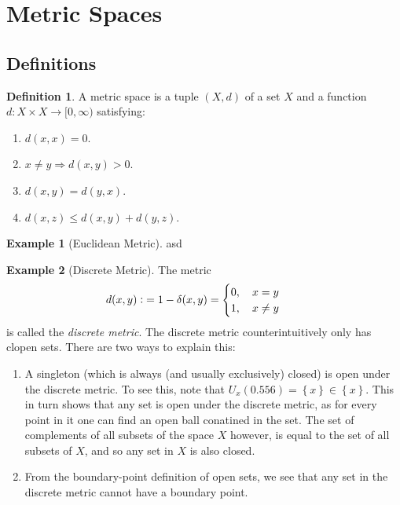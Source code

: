 \documentclass{article}
\newcommand{\vc}{\vcentcolon}
\theoremstyle{definition}
\newtheorem{defn}{Definition}[subsubsection]
\newtheorem{example}{Example}[subsubsection]
\begin{document}
\section{Metric Spaces}
\subsection{Definitions}
\begin{defn}
	A metric space is a tuple $(X,d)$ of a set $X$ and a function $d:X\times X\rightarrow[0,\infty)$ satisfying:
	\begin{enumerate}
		\item $d(x,x)=0$.
		\item $x\not=y\Rightarrow d(x,y)>0$.
		\item $d(x,y)=d(y,x)$.
		\item $d(x,z)\leq d(x,y)+d(y,z)$.
	\end{enumerate}
\end{defn}
\begin{example}[Euclidean Metric]
	asd
\end{example}
\begin{example}[Discrete Metric]
	The metric
	\begin{align*}
		d(x,y)\vc&=1-\delta(x,y)=\begin{cases}
			0,\quad x=y\\
			1,\quad x\not=y
		\end{cases}
	\end{align*}
	is called the \emph{discrete metric}. The discrete metric counterintuitively only has clopen sets. There are two ways to explain this:
	\begin{enumerate}
		\item A singleton (which is always (and usually exclusively) closed) is open under the discrete metric. To see this, note that $U_x(0.556)=\left\{x\right\}\in\left\{x\right\}$. This in turn shows that any set is open under the discrete metric, as for every point in it one can find an open ball conatined in the set. The set of complements of all subsets of the space $X$ however, is equal to the set of all subsets of $X$, and so any set in $X$ is also closed.
		\item From the boundary-point definition of open sets, we see that any set in the discrete metric cannot have a boundary point.	
	\end{enumerate}
\end{example}
\end{document}
